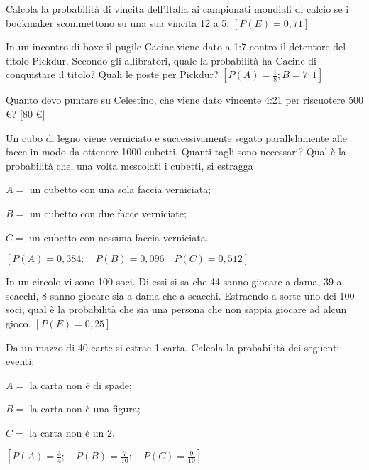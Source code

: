 \begin{esercizio}[\Ast]
 \label{ese:9.40}
Calcola la probabilità di vincita dell'Italia ai campionati mondiali di calcio 
se i bookmaker scommettono su una sua vincita 12 a 5.
\hfill \(\left[P(E)=0,71\right]\)
\end{esercizio}

\begin{esercizio}[\Ast]
 \label{ese:9.41}
In un incontro di boxe il pugile Cacine viene dato a 1:7 contro il detentore del 
titolo Pickdur.
Secondo gli allibratori, quale la probabilità ha Cacine di conquistare il 
titolo?
Quali le poste per Pickdur?
\hfill \(\left[P(A)=\frac 1 8;B=7:1\right]\)
\end{esercizio}

\begin{esercizio}[\Ast]
 \label{ese:9.42}
Quanto devo puntare su Celestino, che viene dato vincente 4:21 per riscuotere 
500 €?
\hfill [80 €]
\end{esercizio}

\begin{esercizio}[\Ast]
 \label{ese:9.43}
Un cubo di legno viene verniciato e successivamente segato parallelamente alle 
facce in modo da ottenere 1000 cubetti. Quanti tagli sono necessari? Qual è la 
probabilità che, una volta mescolati i cubetti, si estragga
\begin{itemize*}
\item \( A= \) un cubetto con una sola faccia verniciata;
\item \( B= \) un cubetto con due facce verniciate;
\item \( C= \) un cubetto con nessuna faccia verniciata.
\end{itemize*}
\hfill \(\left[P(A)=0,384; \quad P(B)=0,096 \quad P(C)=0,512\right]\)
\end{esercizio}

\begin{esercizio}[\Ast]
 \label{ese:9.44}
In un circolo vi sono 100 soci. Di essi si sa che 44 sanno giocare a dama, 39 a 
scacchi, 8 sanno giocare sia a dama che a scacchi. Estraendo a sorte uno dei 100 
soci, qual è la probabilità che sia una persona che non sappia giocare ad alcun 
gioco.
\hfill \(\left[P(E)=0,25\right]\)
\end{esercizio}

\begin{esercizio}[\Ast]
 \label{ese:9.45}
Da un mazzo di 40 carte si estrae 1 carta. Calcola la probabilità dei seguenti 
eventi:
\begin{itemize*}
\item \( A= \) la carta non è di spade;
\item \( B= \) la carta non è una figura;
\item \( C= \) la carta non è un 2.
\end{itemize*}
\hfill \(\left[P(A)=\frac 3 4; \quad P(B)=\frac 7{10}; \quad 
P(C)=\frac 9{10}\right]\)
\end{esercizio}

